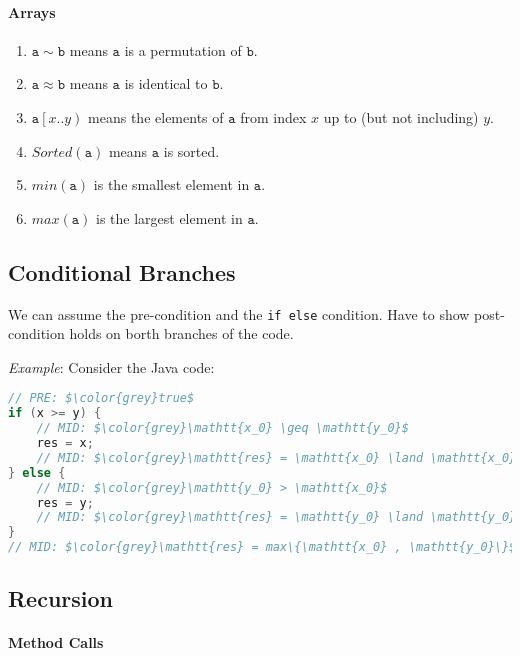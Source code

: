 \documentclass[10pt,twoside,twocolumn]{article}
\begin{document}
\paragraph{Arrays}
\begin{enumerate}
\item $\mathtt{a}\sim\mathtt{b}$ means $\mathtt{a}$ is a permutation of
$\mathtt{b}$.
\item $\mathtt{a}\approx\mathtt{b}$ means $\mathtt{a}$ is identical to
$\mathtt{b}$.
\item $\mathtt{a}\left[x..y\right)$ means the elements of $\mathtt{a}$
from index $x$ up to (but not including) $y$.
\item $Sorted\left(\mathtt{a}\right)$ means $\mathtt{a}$ is sorted.
\item $min\left(\mathtt{a}\right)$ is the smallest element in $\mathtt{a}$.
\item $max\left(\mathtt{a}\right)$ is the largest element in $\mathtt{a}$.
\end{enumerate}

\subsection{Conditional Branches}

We can assume the pre-condition and the \texttt{if else} condition.
Have to show post-condition holds on borth branches of the code.

\emph{Example}: Consider the Java code:
\begin{lstlisting}[language=Java,basicstyle={\small\ttfamily},tabsize=4,mathescape=true,commentstyle={\color{grey}}]
// PRE: $\color{grey}true$
if (x >= y) {
	// MID: $\color{grey}\mathtt{x_0} \geq \mathtt{y_0}$
	res = x;
	// MID: $\color{grey}\mathtt{res} = \mathtt{x_0} \land \mathtt{x_0} \geq \mathtt{y_0}$
} else {
	// MID: $\color{grey}\mathtt{y_0} > \mathtt{x_0}$
	res = y;
	// MID: $\color{grey}\mathtt{res} = \mathtt{y_0} \land \mathtt{y_0} > \mathtt{x_0}$
}
// MID: $\color{grey}\mathtt{res} = max\{\mathtt{x_0} , \mathtt{y_0}\}$
\end{lstlisting}



\subsection{Recursion}


\paragraph{Method Calls}
\end{document}

